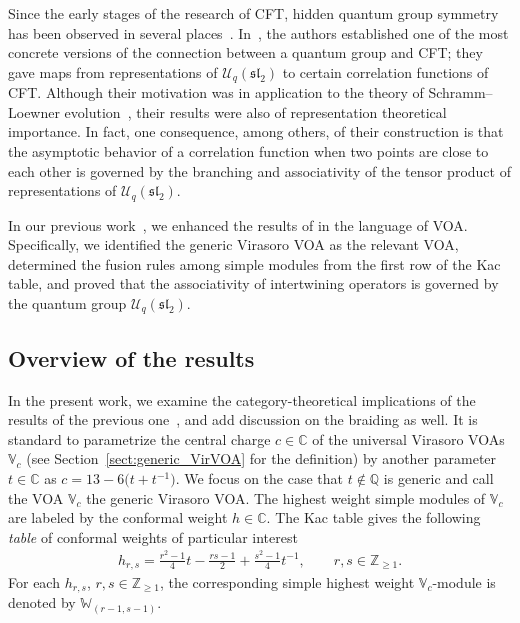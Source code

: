 \documentclass[pdftex]{sigma}
\numberwithin{equation}{section}
\newcommand{\bC}{\mathbb{C}}
\newcommand{\bQ}{\mathbb{Q}}
\newcommand{\bZ}{\mathbb{Z}}
\newcommand{\cU}{\mathcal{U}}
\newcommand{\fsl}{\mathfrak{sl}}
\newcommand{\UEA}{\cU}
\newcommand{\Uq}{\UEA_{q}}
\newcommand{\virvoa}{\mathbb{V}}
\newcommand{\virmod}{\mathbb{W}}
\begin{document}
Since the early stages of the research of CFT, hidden quantum group symmetry has been observed in several places~\cite{FW-topological_representation_of_Uqsl2,GRS-quantum_groups_in_2d_physics,MR-comment_on_quantum_group_symmetry_in_CFT,PS-common_structures_between_finite_systems_and_CFTs,RRR-contour_picture_of_quantum_groups_in_CFT, SV-quantum_groups_and_homology_of_local_systems,
Varchenko-multidimensional_hypergeometric_functions_and_representation_theory_of_Lie_algebras_and_quantum_groups}.
In~\cite{KP-conformally_covariant_bdry_correlations}, the authors established one of the most concrete versions of the connection between a quantum group and CFT;
they gave maps from representations of $\Uq(\fsl_{2})$ to certain correlation functions of CFT.
Although their motivation was in application to the theory of Schramm--Loewner evolution~\cite{BB-CFTs_of_SLEs,Schramm2000}, their results were also of representation theoretical importance.
In fact, one consequence, among others, of their construction is that the asymptotic behavior of a correlation function when two points are close to each other is governed by the branching and associativity of the tensor product of representations of $\Uq(\fsl_{2})$.

In our previous work~\cite{KoshidaKytola2022}, we enhanced the results of \cite{KP-conformally_covariant_bdry_correlations} in the language of VOA.
Specifically, we identified the generic Virasoro VOA as the relevant VOA, determined the fusion rules among simple modules from the first row of the Kac table, and proved that the associativity of intertwining operators is governed by the quantum group $\Uq(\fsl_{2})$.

\subsection{Overview of the results}
In the present work, we examine the category-theoretical implications of the results of the previous one~\cite{KoshidaKytola2022},
and add discussion on the braiding as well.
It is standard to parametrize the central charge $c\in \bC$ of the universal Virasoro VOAs $\virvoa_{c}$ (see Section~\ref{sect:generic_VirVOA} for the definition)
by another parameter $t\in \bC$ as
$
	c = 13 - 6 \big(t + t^{-1}\big)$.
We focus on the case that $t\not\in\bQ$ is generic and call the VOA $\virvoa_{c}$ the generic Virasoro VOA.
The highest weight simple modules of $\virvoa_{c}$ are labeled by the conformal weight $h\in \bC$.
The Kac table gives the following {\it table} of conformal weights of particular interest
\begin{gather*}
	h_{r,s} = \frac{r^{2}-1}{4}t-\frac{rs-1}{2}+\frac{s^{2}-1}{4}t^{-1},\qquad r,s\in \bZ_{\geq 1}.
\end{gather*}
For each $h_{r,s}$, $r,s\in\bZ_{\geq 1}$, the corresponding simple highest weight $\virvoa_{c}$-module is denoted by $\virmod_{(r-1,s-1)}$.
\end{document}
